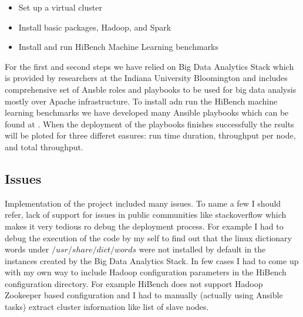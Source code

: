 \documentclass[12pt, letterpaper]{article}
\begin{document}
\begin{itemize}
    \item Set up a virtual cluster
    \item Install basic packages, Hadoop, and Spark
    \item Install and run HiBench Machine Learning benchmarks
\end{itemize}

For the first and second steps we have relied on Big Data Analytics Stack \cite{bds} which is provided by researchers at the Indiana University Bloomington and includes comprehensive set of Ansble roles and playbooks to be used for big data analysis mostly over Apache infrastructure.  To install adn run the HiBench machine learning benchmarks we have developed many Ansible playbooks which can be found at \cite{hibenchconf}. When the deployment of the playbooks finishes successfully the rsults will be ploted for three differet easures: run time duration, throughput per node, and total throughput. 

\subsection{Issues}
Implementation of the project included many issues. To name a few I should refer, lack of support for issues in public communities like stackoverflow which makes it very tedious ro debug the deployment process. For example I had to debug the execution of the code by my self to find out that the linux dictionary words under $/usr/share/dict/words$ were not installed by default in the instances created by the Big Data Analytics Stack. In few cases I had to come up with my own way to include Hadoop configuration parameters in the HiBench configuration directory. For example HiBench does not support Hadoop Zookeeper based configuration and I had to manually (actually using Ansible tasks) extract cluster information like list of slave nodes.
\end{document}
